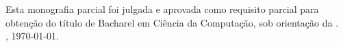 %
% 
%
\begin{folhadeaprovacao}
  \begin{center}
    {\large \textbf{\MakeUppercase{\imprimirinstituicao}}}\\[2cm]
    {\large \textbf{\textrm{\MakeUppercase{\imprimirtitulo}}}}\\[2cm]
    \begin{flushright}
      {\ABNTEXchapterfont\large \textrm{\imprimirautor}}
    \end{flushright}   

    \vspace{2cm}
    \begin{minipage}{1\textwidth}
      \doublespacing
      Esta monografia parcial foi julgada e aprovada como requisito parcial para obtenção do título de Bacharel em Ciência da Computação,
      sob orientação da \orientador.\\

      \imprimirlocal, \today.
    \end{minipage}%
    \vspace*{\fill}
   \end{center}
    
\assinatura{\professorConvidadoUm}

\begin{center}
  \vfill
  \large \siglaInstituicao \\ \imprimirlocal \\ \anodeaprovacao
\end{center}

\end{folhadeaprovacao}
\newpage